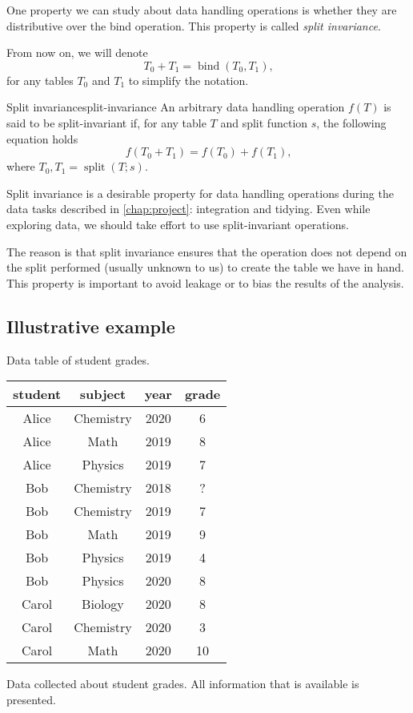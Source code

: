 One property we can study about data handling operations is whether they are distributive
over the bind operation.  This property is called \emph{split invariance}.

From now on, we will denote \[
  T_0 + T_1 = \operatorname{bind}(T_0, T_1)\text{,}
\] for any tables $T_0$ and $T_1$ to simplify the notation.

\begin{defbox}{Split invariance}{split-invariance}
An arbitrary data handling operation $f(T)$ is said to be split-invariant
if, for any table $T$ and split function $s$, the following equation holds \[
  f\!\left(T_0 + T_1\right) =
    f\!\left(T_0\right) + f\!\left(T_1\right)\text{,}
\] where $T_0, T_1 = \operatorname{split}\!\left(T; s\right)$.
\end{defbox}

Split invariance is a desirable property for data handling operations during the data
tasks described in \cref{chap:project}: integration and tidying.  Even while exploring
data, we should take effort to use split-invariant operations.

The reason is that split invariance ensures that the operation does not depend on the
split performed (usually unknown to us) to create the table we have in hand.  This
property is important to avoid \gls{leakage} or to bias the results of the analysis.

\subsection{Illustrative example}

\begin{tablebox}[label=tab:grades1]{Data table of student grades.}
  \centering
  \begin{tabular}{cccc}
    \toprule
    \textbf{student} & \textbf{subject} & \textbf{year} & \textbf{grade} \\
    \midrule
    Alice & Chemistry & 2020 & 6 \\
    Alice & Math & 2019 & 8 \\
    Alice & Physics & 2019 & 7 \\
    Bob & Chemistry & 2018 & ? \\
    Bob & Chemistry & 2019 & 7 \\
    Bob & Math & 2019 & 9 \\
    Bob & Physics & 2019 & 4 \\
    Bob & Physics & 2020 & 8 \\
    Carol & Biology & 2020 & 8 \\
    Carol & Chemistry & 2020 & 3 \\
    Carol & Math & 2020 & 10 \\
    \bottomrule
  \end{tabular}
  \tcblower
  Data collected about student grades.  All information that is available is presented.
\end{tablebox}

